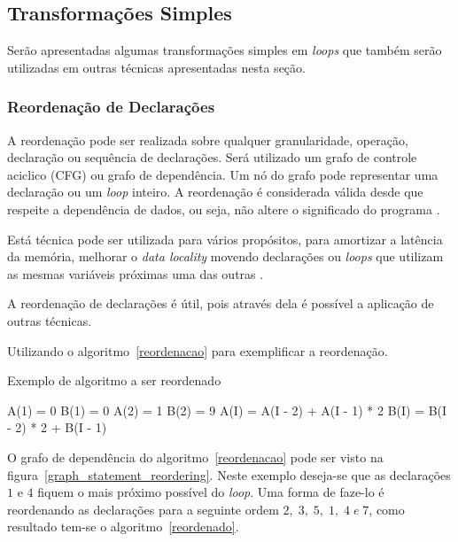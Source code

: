 
\subsection{Transformações Simples}

Serão apresentadas algumas transformações simples em \textit{loops} que também
serão utilizadas em outras técnicas apresentadas nesta seção.

\subsubsection{Reordenação de Declarações}

A reordenação pode ser realizada sobre qualquer granularidade, operação,
declaração ou sequência de declarações. 
Será utilizado um grafo de controle aciclico (CFG) ou grafo de dependência.
Um nó do grafo pode representar uma declaração ou um \textit{loop} inteiro.
A reordenação é considerada válida desde que respeite a dependência de dados, 
ou seja, não altere o significado do programa \cite[9.1]{hpcfpc}.

Está técnica pode ser utilizada para vários propósitos, para 
amortizar a latência da memória, melhorar o \textit{data locality} movendo 
declarações ou \textit{loops} que utilizam as mesmas variáveis próximas uma das 
outras \cite{McKinley:1996}. 

A reordenação de declarações é útil, pois através dela é possível 
a aplicação de outras técnicas. 

Utilizando o algoritmo~\ref{reordenacao} para exemplificar a reordenação. 

\begin{algorithm}
\caption{Exemplo de algoritmo a ser reordenado}
\label{reordenacao}
\begin{algorithmic}[1]

\STATE A(1) = 0
\STATE B(1) = 0
\STATE A(2) = 1
\STATE B(2) = 9
\ENDIF
{}
\STATE A(I) = A(I - 2) + A(I - 1) * 2
\STATE B(I) = B(I - 2) * 2 + B(I - 1) 
\ENDFOR

\end{algorithmic}
\end{algorithm}

O grafo de dependência do algoritmo~\ref{reordenacao} pode ser visto na 
figura~\ref{graph_statement_reordering}. 
Neste exemplo deseja-se que as declarações $1$ e $4$ fiquem o mais próximo 
possível do \textit{loop}. 
Uma forma de faze-lo é reordenando as declarações para a seguinte ordem $2,\; 3,\; 5,
\;1,\; 4\; e\; 7$, como resultado tem-se o algoritmo~\ref{reordenado}.



